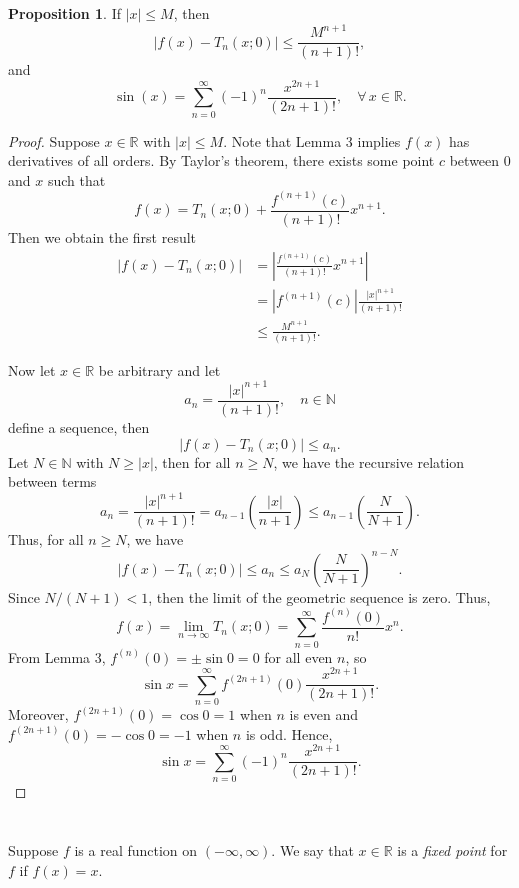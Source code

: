 \documentclass[12pt]{article}
\newenvironment{problem}
    {\begin{lrbox}{\mybox}\begin{minipage}{0.98\textwidth}}
    {\end{minipage}\end{lrbox}\begin{center}\framebox[\textwidth]{\usebox{\mybox}}\end{center}}
\theoremstyle{definition}
\newtheorem{proposition}{Proposition}
\newcommand{\N}{\mathbb{N}}
\newcommand{\R}{\mathbb{R}}
\begin{document}
\begin{proposition}
    If $|x|\le M$, then 
    \[
        \left| f(x) - T_n(x; 0)\right| \leq \frac{M^{n+1}}{(n+1)!},
    \]
    and 
    \[
        \sin(x) = \sum_{n=0}^\infty (-1)^n \frac{x^{2n+1}}{(2n+1)!},\quad \forall\,x\in\R.
    \]
    
\end{proposition}

\begin{proof}
    Suppose $x \in \R$ with $|x| \leq M$. Note that Lemma 3 implies $f(x)$ has derivatives of all orders. By Taylor's theorem, there exists some point $c$ between $0$ and $x$ such that
    \[
        f(x) = T_n(x; 0) + \frac{f^{(n+1)}(c)}{(n+1)!} x^{n+1}.
    \]
    Then we obtain the first result
    \begin{align*}
        |f(x) - T_n(x; 0)|
            &= \left| \frac{f^{(n+1)}(c)}{(n+1)!} x^{n+1} \right| \\
            &= \left|f^{(n+1)}(c)\right| \frac{|x|^{n+1}}{(n+1)!} \\
            &\leq \frac{M^{n+1}}{(n+1)!}.
    \end{align*}
    
    Now let $x \in \R$ be arbitrary and let
    \[
        a_n = \frac{|x|^{n+1}}{(n+1)!}, \quad n \in \N
    \]
    define a sequence, then
    \[
        |f(x) - T_n(x; 0)| \leq a_n.
    \]
    Let $N \in \N$ with $N \geq |x|$, then for all $n \geq N$, we have the recursive relation between terms
    \[
        a_n = \frac{|x|^{n+1}}{(n+1)!} = a_{n-1} \left(\frac{|x|}{n+1}\right) \leq a_{n-1} \left(\frac{N}{N+1}\right).
    \]
    Thus, for all $n \geq N$, we have
    \[
        |f(x) - T_n(x; 0)| \leq a_n \leq a_N \left(\frac{N}{N+1}\right)^{n - N}.
    \]
    Since $N/(N+1) < 1$, then the limit of the geometric sequence is zero. Thus,
    \[
        f(x) = \lim_{n \to \infty} T_n(x; 0) = \sum_{n=0}^\infty \frac{f^{(n)}(0)}{n!} x^n.
    \]
    From Lemma 3, $f^{(n)}(0) = \pm\sin 0 = 0$ for all even $n$, so
    \[
        \sin x = \sum_{n=0}^\infty f^{(2n+1)}(0) \frac{x^{2n+1}}{(2n+1)!}.
    \]
    Moreover, $f^{(2n+1)}(0) = \cos 0 = 1$ when $n$ is even and $f^{(2n+1)}(0) = -\cos 0 = -1$ when $n$ is odd. Hence,
    \[
        \sin x = \sum_{n=0}^\infty (-1)^n \frac{x^{2n+1}}{(2n+1)!}.
    \]
    
\end{proof}

\section{}
\begin{problem}
    Suppose $f$ is a real function on $(-\infty,\infty)$. We say that $x\in\mathbb{R}$ is a {\it fixed point} for $f$ if $f(x) = x$. 
\end{problem}
\end{document}
